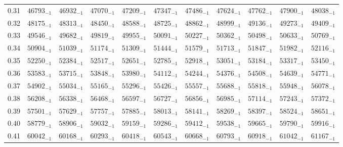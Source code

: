 \documentclass[10pt, a4paper]{article}
\begin{document}
\begin{center}
\begin{longtable}{c || c c c c c | c c c c c}
        0.31 & \({46793}_{-1}\) & \({46932}_{-1}\) & \({47070}_{-1}\) & \({47209}_{-1}\) & \({47347}_{-1}\) & \({47486}_{-1}\) & \({47624}_{-1}\) & \({47762}_{-1}\) & \({47900}_{-1}\) & \({48038}_{-1}\)\\
        0.32 & \({48175}_{-1}\) & \({48313}_{-1}\) & \({48450}_{-1}\) & \({48588}_{-1}\) & \({48725}_{-1}\) & \({48862}_{-1}\) & \({48999}_{-1}\) & \({49136}_{-1}\) & \({49273}_{-1}\) & \({49409}_{-1}\)\\
        0.33 & \({49546}_{-1}\) & \({49682}_{-1}\) & \({49819}_{-1}\) & \({49955}_{-1}\) & \({50091}_{-1}\) & \({50227}_{-1}\) & \({50362}_{-1}\) & \({50498}_{-1}\) & \({50633}_{-1}\) & \({50769}_{-1}\)\\
        0.34 & \({50904}_{-1}\) & \({51039}_{-1}\) & \({51174}_{-1}\) & \({51309}_{-1}\) & \({51444}_{-1}\) & \({51579}_{-1}\) & \({51713}_{-1}\) & \({51847}_{-1}\) & \({51982}_{-1}\) & \({52116}_{-1}\)\\
        0.35 & \({52250}_{-1}\) & \({52384}_{-1}\) & \({52517}_{-1}\) & \({52651}_{-1}\) & \({52785}_{-1}\) & \({52918}_{-1}\) & \({53051}_{-1}\) & \({53184}_{-1}\) & \({53317}_{-1}\) & \({53450}_{-1}\)\\
        0.36 & \({53583}_{-1}\) & \({53715}_{-1}\) & \({53848}_{-1}\) & \({53980}_{-1}\) & \({54112}_{-1}\) & \({54244}_{-1}\) & \({54376}_{-1}\) & \({54508}_{-1}\) & \({54639}_{-1}\) & \({54771}_{-1}\)\\
        0.37 & \({54902}_{-1}\) & \({55034}_{-1}\) & \({55165}_{-1}\) & \({55296}_{-1}\) & \({55426}_{-1}\) & \({55557}_{-1}\) & \({55688}_{-1}\) & \({55818}_{-1}\) & \({55948}_{-1}\) & \({56078}_{-1}\)\\
        0.38 & \({56208}_{-1}\) & \({56338}_{-1}\) & \({56468}_{-1}\) & \({56597}_{-1}\) & \({56727}_{-1}\) & \({56856}_{-1}\) & \({56985}_{-1}\) & \({57114}_{-1}\) & \({57243}_{-1}\) & \({57372}_{-1}\)\\
        0.39 & \({57501}_{-1}\) & \({57629}_{-1}\) & \({57757}_{-1}\) & \({57885}_{-1}\) & \({58013}_{-1}\) & \({58141}_{-1}\) & \({58269}_{-1}\) & \({58397}_{-1}\) & \({58524}_{-1}\) & \({58651}_{-1}\)\\
        \hline
        0.40 & \({58779}_{-1}\) & \({58906}_{-1}\) & \({59032}_{-1}\) & \({59159}_{-1}\) & \({59286}_{-1}\) & \({59412}_{-1}\) & \({59538}_{-1}\) & \({59665}_{-1}\) & \({59790}_{-1}\) & \({59916}_{-1}\)\\
        0.41 & \({60042}_{-1}\) & \({60168}_{-1}\) & \({60293}_{-1}\) & \({60418}_{-1}\) & \({60543}_{-1}\) & \({60668}_{-1}\) & \({60793}_{-1}\) & \({60918}_{-1}\) & \({61042}_{-1}\) & \({61167}_{-1}\)\\

\end{longtable}
\end{center}
\end{document}
